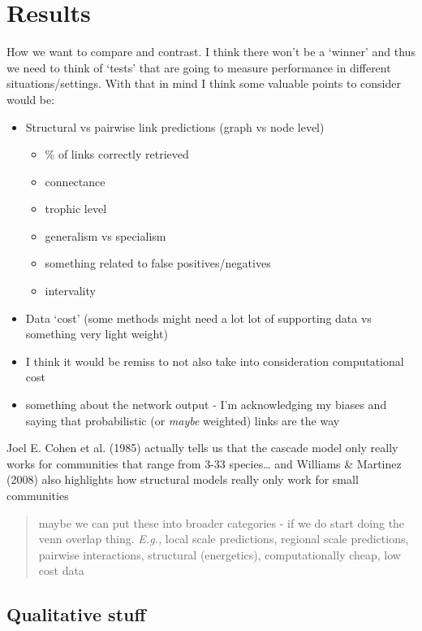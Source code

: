 \documentclass[
]{agujournal2019}
\providecommand{\tightlist}{%
  \setlength{\itemsep}{0pt}\setlength{\parskip}{0pt}}\usepackage{longtable,booktabs,array}
\begin{document}
\section{Results}\label{results}

How we want to compare and contrast. I think there won't be a `winner'
and thus we need to think of `tests' that are going to measure
performance in different situations/settings. With that in mind I think
some valuable points to consider would be:

\begin{itemize}
\tightlist
\item
  Structural vs pairwise link predictions (graph vs node level)

  \begin{itemize}
  \tightlist
  \item
    \% of links correctly retrieved
  \item
    connectance
  \item
    trophic level
  \item
    generalism vs specialism
  \item
    something related to false positives/negatives
  \item
    intervality
  \end{itemize}
\item
  Data `cost' (some methods might need a lot lot of supporting data vs
  something very light weight)
\item
  I think it would be remiss to not also take into consideration
  computational cost
\item
  something about the network output - I'm acknowledging my biases and
  saying that probabilistic (or \emph{maybe} weighted) links are the way
\end{itemize}

Joel E. Cohen et al. (1985) actually tells us that the cascade model
only really works for communities that range from 3-33 species\ldots{}
and Williams \& Martinez (2008) also highlights how structural models
really only work for small communities

\begin{quote}
maybe we can put these into broader categories - if we do start doing
the venn overlap thing. \emph{E.g.,} local scale predictions, regional
scale predictions, pairwise interactions, structural (energetics),
computationally cheap, low cost data
\end{quote}

\subsection{Qualitative stuff}\label{qualitative-stuff}
\end{document}
